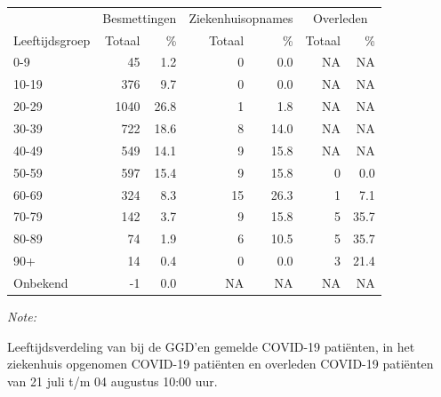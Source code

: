 \documentclass[
  english,
  man,floatsintext]{apa6}
\begin{document}
\begin{table}[H]
\centering\begingroup\fontsize{11}{13}\selectfont

\begin{threeparttable}
\begin{tabular}{lrrrrrr}
\toprule
\multicolumn{1}{c}{ } & \multicolumn{2}{c}{Besmettingen} & \multicolumn{2}{c}{Ziekenhuisopnames} & \multicolumn{2}{c}{Overleden} \\
\cmidrule(l{3pt}r{3pt}){2-3} \cmidrule(l{3pt}r{3pt}){4-5} \cmidrule(l{3pt}r{3pt}){6-7}
Leeftijdsgroep & Totaal & \% & Totaal & \% & Totaal & \%\\
\midrule
0-9 & 45 & 1.2 & 0 & 0.0 & NA & NA\\
10-19 & 376 & 9.7 & 0 & 0.0 & NA & NA\\
20-29 & 1040 & 26.8 & 1 & 1.8 & NA & NA\\
30-39 & 722 & 18.6 & 8 & 14.0 & NA & NA\\
40-49 & 549 & 14.1 & 9 & 15.8 & NA & NA\\
50-59 & 597 & 15.4 & 9 & 15.8 & 0 & 0.0\\
60-69 & 324 & 8.3 & 15 & 26.3 & 1 & 7.1\\
70-79 & 142 & 3.7 & 9 & 15.8 & 5 & 35.7\\
80-89 & 74 & 1.9 & 6 & 10.5 & 5 & 35.7\\
90+ & 14 & 0.4 & 0 & 0.0 & 3 & 21.4\\
Onbekend & -1 & 0.0 & NA & NA & NA & NA\\
\bottomrule
\end{tabular}
\begin{tablenotes}
\item \textit{Note: } 
\item Leeftijdsverdeling van bij de GGD’en gemelde COVID-19 patiënten, in het ziekenhuis opgenomen COVID-19 patiënten en overleden COVID-19 patiënten van 21 juli t/m 04 augustus 10:00 uur.
\end{tablenotes}
\end{threeparttable}
\endgroup{}
\end{table}
\end{document}
